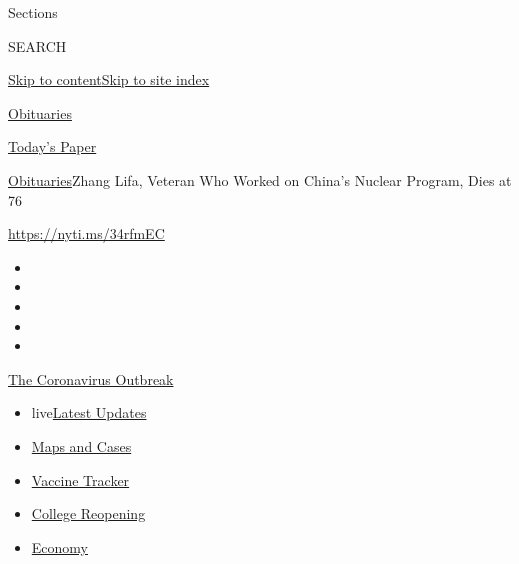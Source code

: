 Sections

SEARCH

\protect\hyperlink{site-content}{Skip to
content}\protect\hyperlink{site-index}{Skip to site index}

\href{https://www.nytimes.com/section/obituaries}{Obituaries}

\href{https://myaccount.nytimes.com/auth/login?response_type=cookie\&client_id=vi}{}

\href{https://www.nytimes.com/section/todayspaper}{Today's Paper}

\href{/section/obituaries}{Obituaries}\textbar{}Zhang Lifa, Veteran Who
Worked on China's Nuclear Program, Dies at 76

\url{https://nyti.ms/34rfmEC}

\begin{itemize}
\item
\item
\item
\item
\item
\end{itemize}

\href{https://www.nytimes.com/news-event/coronavirus?action=click\&pgtype=Article\&state=default\&region=TOP_BANNER\&context=storylines_menu}{The
Coronavirus Outbreak}

\begin{itemize}
\tightlist
\item
  live\href{https://www.nytimes.com/2020/08/03/world/coronavirus-covid-19.html?action=click\&pgtype=Article\&state=default\&region=TOP_BANNER\&context=storylines_menu}{Latest
  Updates}
\item
  \href{https://www.nytimes.com/interactive/2020/us/coronavirus-us-cases.html?action=click\&pgtype=Article\&state=default\&region=TOP_BANNER\&context=storylines_menu}{Maps
  and Cases}
\item
  \href{https://www.nytimes.com/interactive/2020/science/coronavirus-vaccine-tracker.html?action=click\&pgtype=Article\&state=default\&region=TOP_BANNER\&context=storylines_menu}{Vaccine
  Tracker}
\item
  \href{https://www.nytimes.com/2020/08/02/us/covid-college-reopening.html?action=click\&pgtype=Article\&state=default\&region=TOP_BANNER\&context=storylines_menu}{College
  Reopening}
\item
  \href{https://www.nytimes.com/live/2020/08/03/business/stock-market-today-coronavirus?action=click\&pgtype=Article\&state=default\&region=TOP_BANNER\&context=storylines_menu}{Economy}
\end{itemize}

